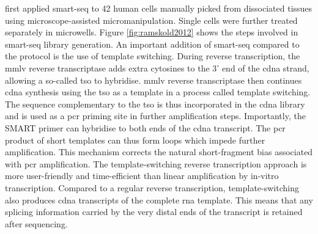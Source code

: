 \citeauthor{ramskold2012} first applied \acrshort{smart-seq} to 42 human cells manually picked from dissociated tissues using microscope-assisted micromanipulation. Single cells were further treated separately in microwells. Figure \ref{fig:ramskold2012} shows the steps involved in \acrshort{smart-seq} library generation. An important addition of \acrshort{smart-seq} compared to the \citeauthor{tang2009} protocol is the use of template switching. During reverse transcription, the \acrfull{mmlv} reverse transcriptase adds extra cytosines to the 3' end of the \acrshort{cdna} strand, allowing a so-called \acrfull{tso} to hybridise. \acrshort{mmlv} reverse transcriptase then continues \acrshort{cdna} synthesis using the \acrshort{tso} as a template in a process called template switching. The sequence complementary to the \acrshort{tso} is thus incorporated in the \acrshort{cdna} library and is used as a \acrshort{pcr} priming site in further amplification steps. Importantly, the SMART primer can hybridise to both ends of the \acrshort{cdna} transcript. The \acrshort{pcr} product of short templates can thus form loops which impede further amplification. This mechanism corrects the natural short-fragment bias associated with \acrshort{pcr} amplification. The template-switching reverse transcription approach is more user-friendly and time-efficient than linear amplification by in-vitro transcription. Compared to a regular reverse transcription, template-switching also produces \acrshort{cdna} transcripts of the complete \acrshort{rna} template. This means that any splicing information carried by the very distal ends of the transcript is retained after sequencing.\pms


